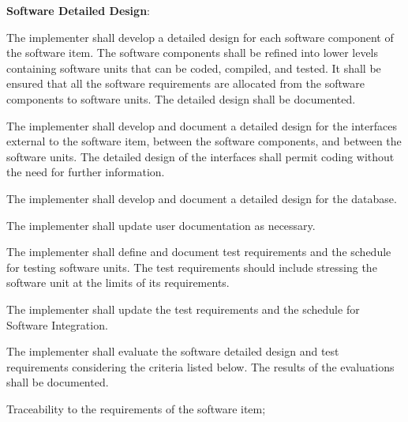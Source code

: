 			\begin{adjustwidth}{2em}{0pt} 

				\begin{compactenum}

					\item {\bf Software Detailed Design}:

					\begin{compactenum}

						\item The implementer shall develop a detailed design for each software component of the software item. The software components shall be refined into lower levels containing software units that can be coded, compiled, and tested. It shall be ensured that all the software requirements are allocated from the software components to software units. The detailed design shall be documented.

						\item The implementer shall develop and document a detailed design for the interfaces external to the software item, between the software components, and between the software units. The detailed design of the interfaces shall permit coding without the need for further information.

						\item The implementer shall develop and document a detailed design for the database.

						\item The implementer shall update user documentation as necessary.

						\item The implementer shall define and document test requirements and the schedule for testing software units. The test requirements should include stressing the software unit at the limits of its requirements.

						\item The implementer shall update the test requirements and the schedule for Software Integration.

						\item The implementer shall evaluate the software detailed design and test requirements considering the criteria listed below. The results of the evaluations shall be documented.

						\begin{compactenum}

							\item Traceability to the requirements of the software item;


\end{compactenum}
\end{compactenum}
\end{compactenum}
\end{adjustwidth}

